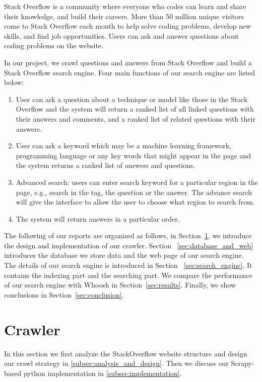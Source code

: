 \documentclass[10pt,journal,compsoc]{IEEEtran}
\begin{document}
Stack Overflow is a community where everyone who codes can learn and share their knowledge, and build their careers. More than 50 million unique visitors come to Stack Overflow each month to help solve coding problems, develop new skills, and find job opportunities. Users can ask and answer questions about coding problems on the website. 

In our project, we crawl questions and answers from Stack Overflow and build a Stack Overflow search engine. Four main functions of our search engine are listed below:
\begin{enumerate}
    \item User can ask a question about a technique or model like those in the Stack Overflow and the system will return a ranked list of all linked questions with their answers and comments, and a ranked list of related questions with their answers. 
    \item User can ask a keyword which may be a machine learning framework, programming language or any key words that might appear in the page and the system returns a ranked list of answers and questions.
    \item Advanced search: users can enter search keyword for a particular region in the page, e.g., search in the tag, the question or the answer. The advance search will give the interface to allow the user to choose what region to search from. 
    \item The system will return answers in a particular order. 
\end{enumerate}

The following of our reports are organized as follows, in Section~\ref{sec:crawler}, we introduce the design and implementation of our crawler. Section ~\ref{sec:database_and_web} introduces the database we store data and the web page of our search engine. The details of our search engine is introduced in Section ~\ref{sec:search_engine}. It contains the indexing part and the searching part. We compare the performance of our search engine with Whoosh in Section~\ref{sec:results}. Finally, we show conclusions in Section~\ref{sec:conclusion}.

 


\section{Crawler}
\label{sec:crawler}
In this section we first analyze the StackOverflow website structure and design our crawl strategy in \ref{subsec:analysis_and_design}. Then we discuss our Scrapy-based python implementation in \ref{subsec:implementation}. 
\end{document}
